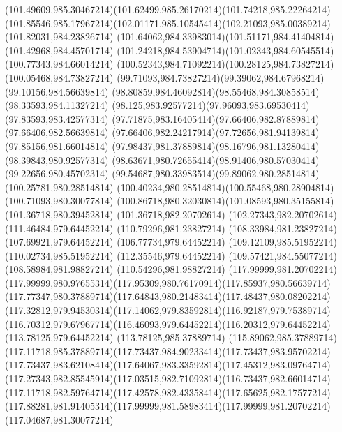 {{	\curveto(101.49609,985.30467214)(101.62499,985.26170214)(101.74218,985.22264214)
	\curveto(101.85546,985.17967214)(102.01171,985.10545414)(102.21093,985.00389214)
	\lineto(101.82031,984.23826714)
	\curveto(101.64062,984.33983014)(101.51171,984.41404814)(101.42968,984.45701714)
	\curveto(101.24218,984.53904714)(101.02343,984.60545514)(100.77343,984.66014214)
	\curveto(100.52343,984.71092214)(100.28125,984.73827214)(100.05468,984.73827214)
	\curveto(99.71093,984.73827214)(99.39062,984.67968214)(99.10156,984.56639814)
	\curveto(98.80859,984.46092814)(98.55468,984.30858514)(98.33593,984.11327214)
	\curveto(98.125,983.92577214)(97.96093,983.69530414)(97.83593,983.42577314)
	\curveto(97.71875,983.16405414)(97.66406,982.87889814)(97.66406,982.56639814)
	\curveto(97.66406,982.24217914)(97.72656,981.94139814)(97.85156,981.66014814)
	\curveto(97.98437,981.37889814)(98.16796,981.13280414)(98.39843,980.92577314)
	\curveto(98.63671,980.72655414)(98.91406,980.57030414)(99.22656,980.45702314)
	\curveto(99.54687,980.33983514)(99.89062,980.28514814)(100.25781,980.28514814)
	\curveto(100.40234,980.28514814)(100.55468,980.28904814)(100.71093,980.30077814)
	\curveto(100.86718,980.32030814)(101.08593,980.35155814)(101.36718,980.39452814)
	\lineto(101.36718,982.20702614)
	\lineto(102.27343,982.20702614)
	\closepath
	\moveto(111.46484,979.64452214)
	\lineto(110.79296,981.23827214)
	\lineto(108.33984,981.23827214)
	\lineto(107.69921,979.64452214)
	\lineto(106.77734,979.64452214)
	\lineto(109.12109,985.51952214)
	\lineto(110.02734,985.51952214)
	\lineto(112.35546,979.64452214)
	\closepath
	\moveto(109.57421,984.55077214)
	\lineto(108.58984,981.98827214)
	\lineto(110.54296,981.98827214)
	\closepath
	\moveto(117.99999,981.20702214)
	\curveto(117.99999,980.97655314)(117.95309,980.76170914)(117.85937,980.56639714)
	\curveto(117.77347,980.37889714)(117.64843,980.21483414)(117.48437,980.08202214)
	\curveto(117.32812,979.94530314)(117.14062,979.83592814)(116.92187,979.75389714)
	\curveto(116.70312,979.67967714)(116.46093,979.64452214)(116.20312,979.64452214)
	\lineto(113.78125,979.64452214)
	\lineto(113.78125,985.37889714)
	\lineto(115.89062,985.37889714)
	\curveto(117.11718,985.37889714)(117.73437,984.90233414)(117.73437,983.95702214)
	\curveto(117.73437,983.62108414)(117.64067,983.33592814)(117.45312,983.09764714)
	\curveto(117.27343,982.85545914)(117.03515,982.71092814)(116.73437,982.66014714)
	\curveto(117.11718,982.59764714)(117.42578,982.43358414)(117.65625,982.17577214)
	\curveto(117.88281,981.91405314)(117.99999,981.58983414)(117.99999,981.20702214)
	\closepath
	\moveto(117.04687,981.30077214)
}}
